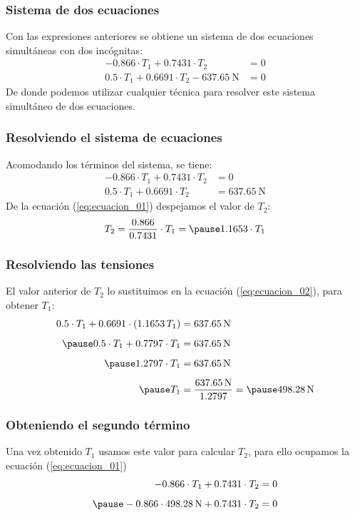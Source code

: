 \documentclass[12pt]{beamer}
\begin{document}
\begin{frame}
\frametitle{Sistema de dos ecuaciones}
Con las expresiones anteriores se obtiene un sistema de dos ecuaciones simultáneas con dos incógnitas:
\pause
\begin{align*}
-0.866 \cdot T_{1} + 0.7431 \cdot T_{2} &= 0 \\[0.5em]
0.5 \cdot T_{1} + 0.6691 \cdot T_{2} - \SI{637.65}{\newton} &= 0
\end{align*}
\pause
De donde podemos utilizar cualquier técnica para resolver este sistema simultáneo de dos ecuaciones.
\end{frame}
\begin{frame}
\frametitle{Resolviendo el sistema de ecuaciones}
Acomodando los términos del sistema, se tiene:
\pause
\begin{align}
-0.866 \cdot T_{1} + 0.7431 \cdot T_{2} &= 0 \label{eq:ecuacion_01} \\[0.5em]
0.5 \cdot T_{1} + 0.6691 \cdot T_{2} &= \SI{637.65}{\newton} \label{eq:ecuacion_02}
\end{align}
\pause
De la ecuación (\ref{eq:ecuacion_01}) despejamos el valor de $T_{2}$:
\pause
\begin{eqnarray*}
\begin{aligned}
T_{2} = \dfrac{0.866}{0.7431} \cdot T_{1} = \pause 1.1653 \cdot T_{1}
\end{aligned}
\end{eqnarray*}
\end{frame}
\begin{frame}
\frametitle{Resolviendo las tensiones}
El valor anterior de $T_{2}$ lo sustituimos en la ecuación (\ref{eq:ecuacion_02}), para obtener $T_{1}$:
\pause
\begin{eqnarray*}
\begin{aligned}
0.5 \cdot T_{1} + 0.6691 \cdot (1.1653 \, T_{1}) &= \SI{637.65}{\newton} \\[0.5em] \pause
0.5 \cdot T_{1} + 0.7797 \cdot T_{1} &= \SI{637.65}{\newton} \\[0.5em] \pause
1.2797 \cdot T_{1} &= \SI{637.65}{\newton} \\[0.5em] \pause
T_{1} &= \dfrac{\SI{637.65}{\newton}}{1.2797} = \pause \SI{498.28}{\newton}
\end{aligned}
\label{eq:ecuacion_03}
\end{eqnarray*}
\end{frame}
\begin{frame}
\frametitle{Obteniendo el segundo término}
Una vez obtenido $T_{1}$ usamos este valor para calcular $T_{2}$, para ello ocupamos la ecuación (\ref{eq:ecuacion_01})
\pause
\begin{eqnarray*}
\begin{aligned}
-0.866 \cdot T_{1} + 0.7431 \cdot T_{2} &= 0 \\[0.5em] \pause
-0.866 \cdot \SI{498.28}{\newton} + 0.7431 \cdot T_{2} &= 0
\end{aligned}
\end{eqnarray*}
\end{frame}
\end{document}
